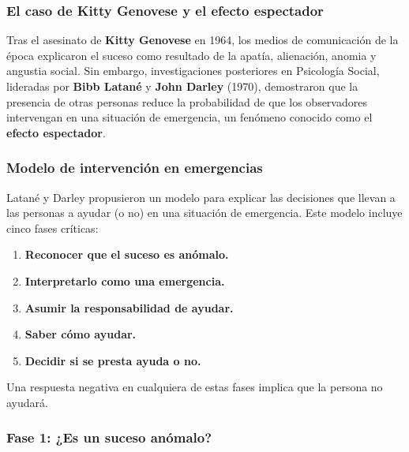 \documentclass[
]{book}
\providecommand{\tightlist}{%
  \setlength{\itemsep}{0pt}\setlength{\parskip}{0pt}}
\begin{document}
\subsubsection{El caso de Kitty Genovese y el efecto espectador}\label{el-caso-de-kitty-genovese-y-el-efecto-espectador}

Tras el asesinato de \textbf{Kitty Genovese} en 1964, los medios de comunicación de la época explicaron el suceso como resultado de la apatía, alienación, anomia y angustia social. Sin embargo, investigaciones posteriores en Psicología Social, lideradas por \textbf{Bibb Latané} y \textbf{John Darley} (1970), demostraron que la presencia de otras personas reduce la probabilidad de que los observadores intervengan en una situación de emergencia, un fenómeno conocido como el \textbf{efecto espectador}.

\subsubsection{Modelo de intervención en emergencias}\label{modelo-de-intervenciuxf3n-en-emergencias}

Latané y Darley propusieron un modelo para explicar las decisiones que llevan a las personas a ayudar (o no) en una situación de emergencia. Este modelo incluye cinco fases críticas:

\begin{enumerate}
\def\labelenumi{\arabic{enumi}.}
\tightlist
\item
  \textbf{Reconocer que el suceso es anómalo.}\\
\item
  \textbf{Interpretarlo como una emergencia.}\\
\item
  \textbf{Asumir la responsabilidad de ayudar.}\\
\item
  \textbf{Saber cómo ayudar.}\\
\item
  \textbf{Decidir si se presta ayuda o no.}
\end{enumerate}

Una respuesta negativa en cualquiera de estas fases implica que la persona no ayudará.

\subsubsection{Fase 1: ¿Es un suceso anómalo?}\label{fase-1-es-un-suceso-anuxf3malo}
\end{document}
